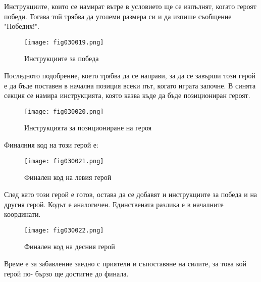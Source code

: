 Инструкциите, които се намират вътре в условието ще се изпълнят, когато героят победи. Тогава той трябва да уголеми размера си и да изпише съобщение "Победих!".

\begin{figure}[H]
  \centering
  \texttt{[image: fig030019.png]}
  \caption{Инструкциите за победа}
\label{fig030019}
\end{figure}

Последното подобрение, което трябва да се направи, за да се завърши този герой е да бъде поставен в начална позиция всеки път, когато играта започне. В синята секция се намира инструкцията, която казва къде да бъде позициониран героят.

\begin{figure}[H]
  \centering
  \texttt{[image: fig030020.png]}
  \caption{Инструкцията за позициониране на героя}
\label{fig030020}
\end{figure}

Финалния код на този герой е:

\begin{figure}[H]
  \centering
  \texttt{[image: fig030021.png]}
  \caption{Финален код на левия герой}
\label{fig030021}
\end{figure}

След като този герой е готов, остава да се добавят и инструкциите за победа и на другия герой. Кодът е аналогичен. Единствената разлика е в началните координати.

\begin{figure}[H]
  \centering
  \texttt{[image: fig030022.png]}
  \caption{Финален код на десния герой}
\label{fig030022}
\end{figure}

Време е за забавление заедно с приятели и съпоставяне на силите, за това кой герой по- бързо ще достигне до финала.